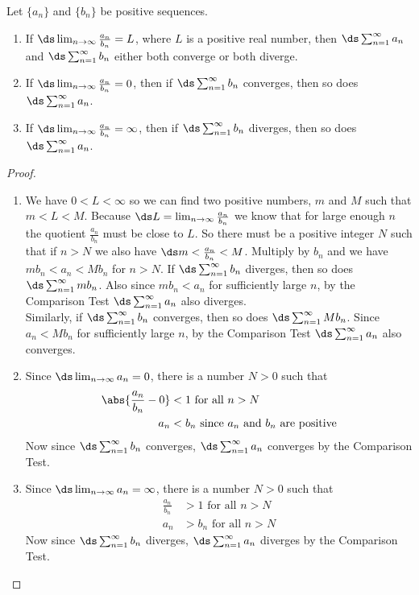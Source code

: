 {Let $\{a_n\}$ and $\{b_n\}$ be positive sequences.
\begin{enumerate}
	\item If $\ds\lim_{n\to\infty} \frac{a_n}{b_n} = L$, where $L$ is a positive real number, then $\ds \sum_{n=1}^\infty a_n$ and $\ds \sum_{n=1}^\infty b_n$ either both converge or both diverge.
	\item	If $\ds\lim_{n\to\infty} \frac{a_n}{b_n} = 0$, then if $\ds \sum_{n=1}^\infty b_n$ converges, then so does $\ds \sum_{n=1}^\infty a_n$.
	\item	If $\ds\lim_{n\to\infty} \frac{a_n}{b_n} = \infty$, then if $\ds \sum_{n=1}^\infty b_n$ diverges, then so does $\ds \sum_{n=1}^\infty a_n$.
\end{enumerate}}

\begin{proof}
\begin{enumerate}
\item We have $0<L<\infty$ so we can find two positive numbers, $m$ and $M$ such that $m<L<M$. Because $\ds L=\lim_{n\to\infty} \frac{a_n}{b_n}$ we know that for large enough $n$ the quotient $\frac{a_n}{b_n}$ must be close to $L$. So there must be a positive integer $N$ such that if $n>N$ we also have $\ds m<\frac{a_n}{b_n}<M$. Multiply by $b_n$ and we have $mb_n<a_n<Mb_n$ for $n>N$. If $\ds \sum_{n=1}^\infty b_n$ diverges, then so does $\ds \sum_{n=1}^\infty mb_n$. Also since $mb_n<a_n$ for sufficiently large $n$, by the Comparison Test $\ds \sum_{n=1}^\infty a_n$ also diverges. \\
Similarly, if $\ds \sum_{n=1}^\infty b_n$ converges, then so does $\ds \sum_{n=1}^\infty Mb_n$. Since $a_n<Mb_n$ for sufficiently large $n$, by the Comparison Test $\ds \sum_{n=1}^\infty a_n$ also converges.
\item Since $\ds \lim_{n\to\infty} a_n =0$, there is a number $N>0$ such that 
\begin{align*}
\abs{\frac{a_n}{b_n}-0}&<1\text{ for all }n>N \\
a_n&<b_n\text{ since }a_n\text{ and }b_n\text{ are positive}
\end{align*}
Now since $\ds \sum_{n=1}^\infty b_n$ converges, $\ds \sum_{n=1}^\infty a_n$ converges by the Comparison Test.
\item Since $\ds \lim_{n\to\infty} a_n =\infty$, there is a number $N>0$ such that 
\begin{align*}
\frac{a_n}{b_n}&>1\text{ for all }n>N \\
a_n&>b_n\text{ for all }n>N 
\end{align*}
Now since $\ds \sum_{n=1}^\infty b_n$ diverges, $\ds \sum_{n=1}^\infty a_n$ diverges by the Comparison Test.\qedhere
\end{enumerate}
\end{proof}


